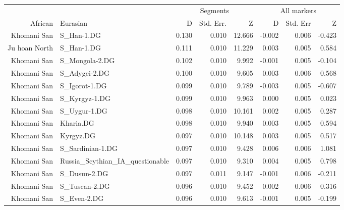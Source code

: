 \documentclass{article}
\begin{document}

\clearpage

\begin{table}[ht]
\centering
\begin{tabular}{rlrrrrrr}
  \hline
  & & \multicolumn{3}{c}{Segments} & \multicolumn{3}{c}{All markers} \\ \cline{3-8}
African & Eurasian & D & Std. Err. & Z & D & Std. Err & Z \\ 
  \hline
Khomani San & S\_Han-1.DG & 0.130 & 0.010 & 12.666 & -0.002 & 0.006 & -0.423 \\ 
  Ju hoan North & S\_Han-1.DG & 0.111 & 0.010 & 11.229 & 0.003 & 0.005 & 0.584 \\ 
  Khomani San & S\_Mongola-2.DG & 0.102 & 0.010 & 9.992 & -0.001 & 0.005 & -0.104 \\ 
  Khomani San & S\_Adygei-2.DG & 0.100 & 0.010 & 9.605 & 0.003 & 0.006 & 0.568 \\ 
  Khomani San & S\_Igorot-1.DG & 0.099 & 0.010 & 9.789 & -0.003 & 0.005 & -0.607 \\ 
  Khomani San & S\_Kyrgyz-1.DG & 0.099 & 0.010 & 9.963 & 0.000 & 0.005 & 0.023 \\ 
  Khomani San & S\_Uygur-1.DG & 0.098 & 0.010 & 10.161 & 0.002 & 0.005 & 0.287 \\ 
  Khomani San & Kharia.DG & 0.098 & 0.010 & 9.940 & 0.003 & 0.005 & 0.594 \\ 
  Khomani San & Kyrgyz.DG & 0.097 & 0.010 & 10.148 & 0.003 & 0.005 & 0.517 \\ 
  Khomani San & S\_Sardinian-1.DG & 0.097 & 0.010 & 9.428 & 0.006 & 0.006 & 1.081 \\ 
  Khomani San & {\small Russia\_Scythian\_IA\_questionable } & 0.097 & 0.010 & 9.310 & 0.004 & 0.005 & 0.798 \\ 
  Khomani San & S\_Dusun-2.DG & 0.097 & 0.011 & 9.147 & -0.001 & 0.006 & -0.211 \\ 
  Khomani San & S\_Tuscan-2.DG & 0.096 & 0.010 & 9.452 & 0.002 & 0.006 & 0.316 \\ 
  Khomani San & S\_Even-2.DG & 0.096 & 0.010 & 9.613 & -0.001 & 0.005 & -0.199 \\ 

\end{tabular}
\end{table}
\end{document}
